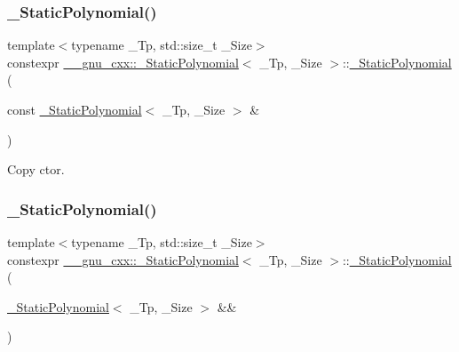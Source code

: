 \subsubsection{\texorpdfstring{\+\_\+\+Static\+Polynomial()}{\_StaticPolynomial()}\hspace{0.1cm}{\footnotesize\ttfamily [2/8]}}
{\footnotesize\ttfamily template$<$typename \+\_\+\+Tp, std\+::size\+\_\+t \+\_\+\+Size$>$ \\
constexpr \hyperlink{class____gnu__cxx_1_1__StaticPolynomial}{\+\_\+\+\_\+gnu\+\_\+cxx\+::\+\_\+\+Static\+Polynomial}$<$ \+\_\+\+Tp, \+\_\+\+Size $>$\+::\hyperlink{class____gnu__cxx_1_1__StaticPolynomial}{\+\_\+\+Static\+Polynomial} (\begin{DoxyParamCaption}\item[{const \hyperlink{class____gnu__cxx_1_1__StaticPolynomial}{\+\_\+\+Static\+Polynomial}$<$ \+\_\+\+Tp, \+\_\+\+Size $>$ \&}]{ }\end{DoxyParamCaption})\hspace{0.3cm}{\ttfamily [default]}}

Copy ctor. \mbox{\label{class____gnu__cxx_1_1__StaticPolynomial_af7f38ef30d5ad83c60da2bc389cb7b29}} 
\subsubsection{\texorpdfstring{\+\_\+\+Static\+Polynomial()}{\_StaticPolynomial()}\hspace{0.1cm}{\footnotesize\ttfamily [3/8]}}
{\footnotesize\ttfamily template$<$typename \+\_\+\+Tp, std\+::size\+\_\+t \+\_\+\+Size$>$ \\
constexpr \hyperlink{class____gnu__cxx_1_1__StaticPolynomial}{\+\_\+\+\_\+gnu\+\_\+cxx\+::\+\_\+\+Static\+Polynomial}$<$ \+\_\+\+Tp, \+\_\+\+Size $>$\+::\hyperlink{class____gnu__cxx_1_1__StaticPolynomial}{\+\_\+\+Static\+Polynomial} (\begin{DoxyParamCaption}\item[{\hyperlink{class____gnu__cxx_1_1__StaticPolynomial}{\+\_\+\+Static\+Polynomial}$<$ \+\_\+\+Tp, \+\_\+\+Size $>$ \&\&}]{ }\end{DoxyParamCaption})\hspace{0.3cm}{\ttfamily [default]}}

